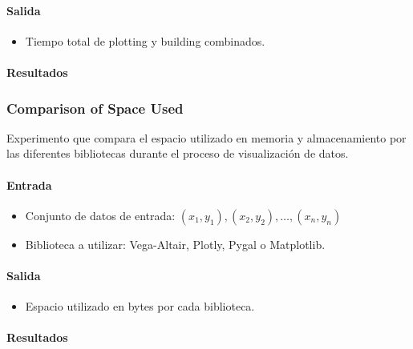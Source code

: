 \paragraph{Salida}
\begin{itemize}
    \item Tiempo total de plotting y building combinados.
\end{itemize}

\paragraph{Resultados}
\vspace{0.5em}
\noindent

\VegaAltairPlottingBuildingComparison

\subsubsection{Comparison of Space Used}
\label{comparison_of_space_used}

Experimento que compara el espacio utilizado en memoria y almacenamiento por las diferentes bibliotecas durante el proceso de visualización de datos.

\paragraph{Entrada}
\begin{itemize}
    \item Conjunto de datos de entrada: \( (x_1, y_1), (x_2, y_2), \ldots, (x_n, y_n) \)
    \item Biblioteca a utilizar: Vega-Altair, Plotly, Pygal o Matplotlib.
\end{itemize}

\paragraph{Salida}
\begin{itemize}
    \item Espacio utilizado en bytes por cada biblioteca.
\end{itemize}

\paragraph{Resultados}
\vspace{0.5em}
\noindent

\ComparisonOfSpaceUsed

